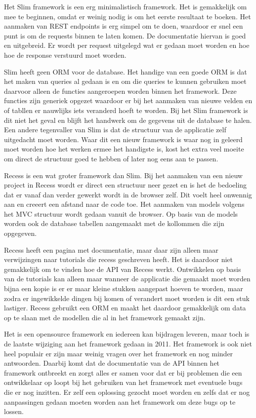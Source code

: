 \documentclass[a4paper,11pt,oneside]{report}
\begin{document}
Het Slim framework is een erg minimalistisch framework. Het is gemakkelijk om mee te beginnen, omdat er weinig nodig is om het eerste resultaat te boeken. Het aanmaken van REST endpoints is erg simpel om te doen, waardoor er snel een punt is om de requests binnen te laten komen. De documentatie hiervan is goed en uitgebreid. Er wordt per request uitgelegd wat er gedaan moet worden en hoe hoe de response verstuurd moet worden. 

Slim heeft geen ORM voor de database. Het handige van een goede ORM is dat het maken van queries al gedaan is en om die queries te kunnen gebruiken moet daarvoor alleen de functies aangeroepen worden binnen het framework. Deze functies zijn generiek opgezet waardoor er bij het aanmaken van nieuwe velden en of tabllen er nauwlijks iets veranderd hoeft te worden. Bij het Slim framework is dit niet het geval en blijft het handwerk om de gegevens uit de database te halen. Een andere tegenvaller van Slim is dat de structuur van de applicatie zelf uitgedacht moet worden. Waar dit een nieuw framework is waar nog in geleerd moet worden hoe het werken ermee het handigste is, kost het extra veel moeite om direct de structuur goed te hebben of later nog eens aan te passen. 
\newline

Recess is een wat groter framework dan Slim. Bij het aanmaken van een nieuw project in Recess wordt er direct een structuur neer gezet en is het de bedoeling dat er vanaf dan verder gewerkt wordt in de browser zelf. Dit voelt heel onwennig aan en creeert een afstand naar de code toe. Het aanmaken van models volgens het MVC structuur wordt gedaan vanuit de browser. Op basis van de models worden ook de database tabellen aangemaakt met de kollommen die zijn opgegeven.

Recess heeft een pagina met documentatie, maar daar zijn alleen maar verwijzingen naar tutorials die recess geschreven heeft. Het is daardoor niet gemakkelijk om te vinden hoe de API van Recess werkt. Ontwikkelen op basis van de tutorials kan alleen maar wanneer de applicatie die gemaakt moet worden bijna een kopie is er er maar kleine stukken aangepast hoeven te worden, maar zodra er ingewikkelde dingen bij komen of verandert moet worden is dit een stuk lastiger. Recess gebruikt een ORM en maakt het daardoor gemakkelijk om data op te slaan met de modellen die al in het framework gemaakt zijn.

Het is een opensource framework en iedereen kan bijdragen leveren, maar toch is de laatste wijziging aan het framework gedaan in 2011. Het framework is ook niet heel populair er zijn maar weinig vragen over het framework en nog minder antwoorden. Daarbij komt dat de documentatie van de API binnen het framework ontbreekt en zorgt alles er samen voor dat er bij problemen die een ontwikkelaar op loopt bij het gebruiken van het framework met eventuele bugs die er nog inzitten. Er zelf een oplossing gezocht moet worden en zelfs dat er nog aanpassingen gedaan moeten worden aan het framework om deze bugs op te lossen.
\newline
\end{document}
